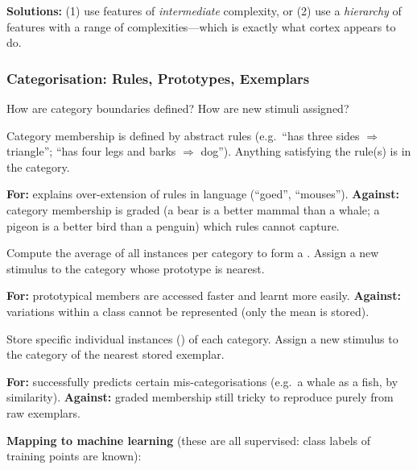 \textbf{Solutions:} (1) use features of \emph{intermediate} complexity, or (2) use a \emph{hierarchy} of features with a range of complexities---which is exactly what cortex appears to do.

\bigseparator

\subsubsection{Categorisation: Rules, Prototypes, Exemplars}

How are category boundaries defined? How are new stimuli assigned?

\begin{defbox}[Rules]
Category membership is defined by abstract rules (e.g.\ ``has three sides $\Rightarrow$ triangle''; ``has four legs and barks $\Rightarrow$ dog''). Anything satisfying the rule(s) is in the category.
\end{defbox}
\textbf{For:} explains over-extension of rules in language (``goed'', ``mouses''). \textbf{Against:} category membership is graded (a bear is a better mammal than a whale; a pigeon is a better bird than a penguin) which rules cannot capture.

\begin{defbox}[Prototypes]
Compute the average of all instances per category to form a . Assign a new stimulus to the category whose prototype is nearest.
\end{defbox}
\textbf{For:} prototypical members are accessed faster and learnt more easily. \textbf{Against:} variations within a class cannot be represented (only the mean is stored).

\begin{defbox}[Exemplars]
Store specific individual instances () of each category. Assign a new stimulus to the category of the nearest stored exemplar.
\end{defbox}
\textbf{For:} successfully predicts certain mis-categorisations (e.g.\ a whale as a fish, by similarity). \textbf{Against:} graded membership still tricky to reproduce purely from raw exemplars.

\separator

\textbf{Mapping to machine learning} (these are all supervised: class labels of training points are known):

